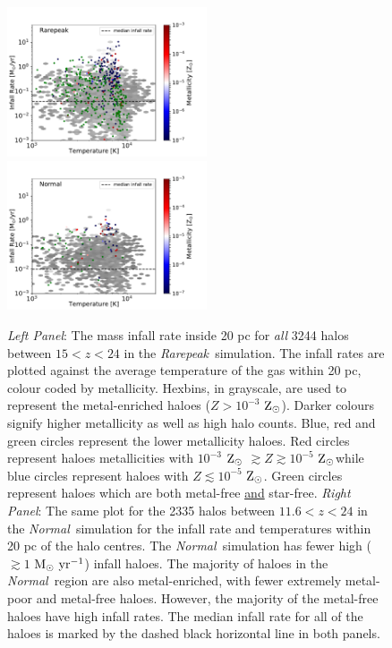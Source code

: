 \documentclass[graphics, twocolumn, usenatbib]{mn2e}
\newcommand{\msolaryrc} {$\rm{M_{\odot}~yr^{-1}}$}
\newcommand{\zsolar} {$\rm{Z_{\odot}}~$}
\newcommand{\zsolarc} {$\rm{Z_{\odot}}$}
\newcommand{\rarepeak} {\textit{Rarepeak~}}
\newcommand{\normal} {\textit{Normal~}}
\begin{document}
\begin{figure}
\centering
\begin{minipage}{175mm}      \begin{center} 
\centerline{
\includegraphics[width=0.525\textwidth]{FIGURES/Rarepeak_MdotTZ.pdf}
\includegraphics[width=0.525\textwidth]{FIGURES/Normal_MdotTZ.pdf}}
\caption{\textit{Left Panel}: The mass infall rate inside 20 pc for \textit{all} 
  3244 halos between $15<z<24$ in 
  the \rarepeak simulation. The infall rates are plotted
  against the average temperature of the gas within 20 pc, colour coded by metallicity. Hexbins, in
  grayscale, are used to represent the metal-enriched haloes ($Z > 10^{-3}$ \zsolarc).
  Darker colours signify higher metallicity as well as high halo counts. Blue, red and green circles
  represent the lower metallicity haloes. Red circles represent haloes metallicities
  with $10^{-3} $ \zsolar $\gtrsim Z \gtrsim 10^{-5}$ \zsolarc while blue circles represent
  haloes with $Z \lesssim 10^{-5}$ \zsolarc. Green circles represent haloes which are both
  metal-free \underline{and} star-free.  \textit{Right Panel}: The same plot for the 2335 halos between $11.6<z<24$ in the \normal simulation
  for the infall rate and temperatures within 20 pc of the halo centres.
  The \normal simulation has fewer high ($ \gtrsim 1 $ \msolaryrc) infall haloes.  The majority of haloes in the \normal region are also metal-enriched, with fewer extremely metal-poor and
  metal-free haloes. However, the majority of the metal-free haloes have high infall rates. 
  The median infall rate for all of the haloes is marked by the dashed 
  black horizontal line in both panels.}
  \label{Fig:Scatter}
\end{center} \end{minipage}

\end{figure}
\end{document}
